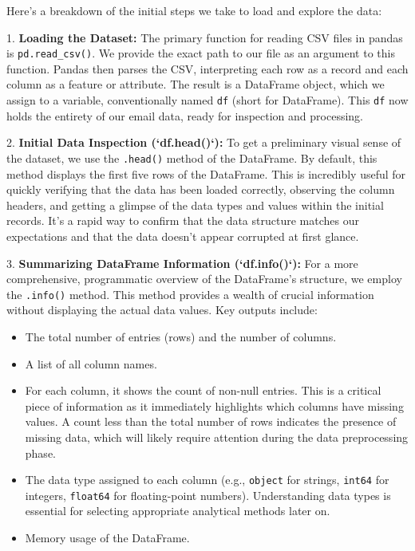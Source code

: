 \documentclass[12pt,a4paper]{article}
\begin{document}
Here's a breakdown of the initial steps we take to load and explore the data:

1.  \textbf{Loading the Dataset:} The primary function for reading CSV files in pandas is \texttt{pd.read\_csv()}. We provide the exact path to our file as an argument to this function. Pandas then parses the CSV, interpreting each row as a record and each column as a feature or attribute. The result is a DataFrame object, which we assign to a variable, conventionally named \texttt{df} (short for DataFrame). This \texttt{df} now holds the entirety of our email data, ready for inspection and processing.

2.  \textbf{Initial Data Inspection (`df.head()`):} To get a preliminary visual sense of the dataset, we use the \texttt{.head()} method of the DataFrame. By default, this method displays the first five rows of the DataFrame. This is incredibly useful for quickly verifying that the data has been loaded correctly, observing the column headers, and getting a glimpse of the data types and values within the initial records. It's a rapid way to confirm that the data structure matches our expectations and that the data doesn't appear corrupted at first glance.

3.  \textbf{Summarizing DataFrame Information (`df.info()`):} For a more comprehensive, programmatic overview of the DataFrame's structure, we employ the \texttt{.info()} method. This method provides a wealth of crucial information without displaying the actual data values. Key outputs include:
\begin{itemize}
    \item The total number of entries (rows) and the number of columns.
    \item A list of all column names.
    \item For each column, it shows the count of non-null entries. This is a critical piece of information as it immediately highlights which columns have missing values. A count less than the total number of rows indicates the presence of missing data, which will likely require attention during the data preprocessing phase.
    \item The data type assigned to each column (e.g., \texttt{object} for strings, \texttt{int64} for integers, \texttt{float64} for floating-point numbers). Understanding data types is essential for selecting appropriate analytical methods later on.
    \item Memory usage of the DataFrame.
\end{itemize}
\end{document}
